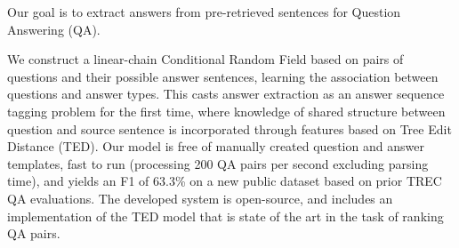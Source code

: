 Our goal is to extract answers from pre-retrieved sentences for Question Answering (QA).                                               
      
 
   We
 construct a
 linear-chain
 Conditional Random Field based on pairs of questions and
 their possible answer sentences, learning the association
 between questions and answer types.  This casts answer
 extraction as an answer sequence tagging problem for the first time, where
 knowledge of shared
 structure between question and source sentence is incorporated through
 features based on Tree Edit Distance (TED).
 Our model is free of manually created question and answer templates,
 fast to run (processing 200 QA pairs per second excluding parsing
 time), and yields an F1 of 63.3\% on a new public dataset based on
 prior TREC QA evaluations.  The developed system is open-source, and
 includes an implementation of the TED model that is state of the art
 in the task of ranking QA pairs.

